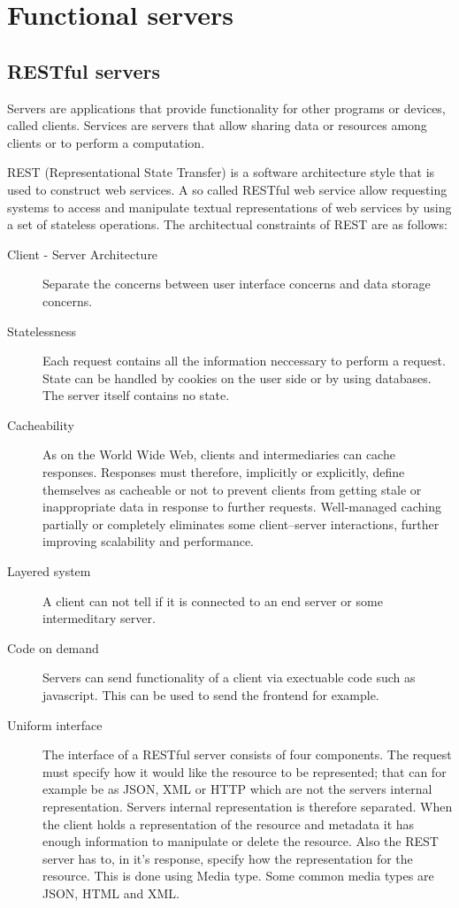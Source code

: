 \section{Functional servers}

\subsection{RESTful servers}


Servers are applications that provide functionality for other programs or
devices, called clients. Services are servers that allow sharing data or
resources among clients or to perform a computation.

REST (Representational State Transfer) is a software architecture style that is
used to construct web services. A so called RESTful web service allow requesting
systems to access and manipulate textual representations of web services by
using a set of stateless operations. The architectual constraints of REST are as
follows:

\begin{description}
\item[ Client - Server Architecture ] Separate the concerns between user
interface concerns and data storage concerns.
\item[Statelessness] Each request contains all the information neccessary to
perform a request. State can be handled by cookies on the user side or by using
databases. The server itself contains no state.
\item[Cacheability] As on the World Wide Web, clients and intermediaries can
cache responses. Responses must therefore, implicitly or explicitly, define
themselves as cacheable or not to prevent clients from getting stale or
inappropriate data in response to further requests. Well-managed caching
partially or completely eliminates some client–server interactions, further
improving scalability and performance. 
\item[Layered system] A client can not tell if it is connected to an end server
or some intermeditary server. 
\item[Code on demand] Servers can send functionality of a client via exectuable
code such as javascript. This can be used to send the frontend for example.
\item[Uniform interface] The interface of a RESTful server consists of four
components. The request must specify how it would like the resource to be
represented; that can for example be as JSON, XML or HTTP which are not the
servers internal representation. Servers internal representation is therefore
separated. When the client holds a representation of the resource and metadata
it has enough information to manipulate or delete the resource. Also the REST
server has to, in it's response, specify how the representation for the
resource. This is done using Media type. Some common media types are JSON, HTML
and XML.
\end{description}


